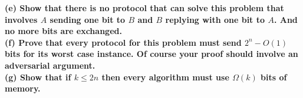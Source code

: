 \documentclass{article}
\begin{document}
\textbf{(e) Show that there is no protocol that can solve this problem that involves $A$ sending one bit to $B$ and $B$ replying with one bit to $A$. And no more bits are exchanged.} \\ \newline
\textbf{(f) Prove that every protocol for this problem must send $2^n - O(1)$ bits for its worst case instance. Of course your proof should involve an adversarial argument.} \\ \newline
\textbf{(g) Show that if $k\leq 2n$ then every algorithm must use $\Omega(k)$ bits of memory.} \\ \newline
\end{document}
